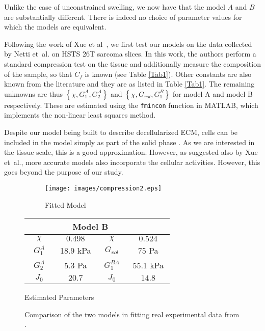 Unlike the case of unconstrained swelling, we now have that the model $A$ and $B$ are substantially different. There is indeed no choice of parameter values for which the models are equivalent. 

Following the work of Xue et al~\cite{ecm2}, we first test our models on the data collected by Netti et~al. \cite{Netti} on HSTS 26T sarcoma slices. In this work, the authors perform a standard compression test on the tissue and additionally measure the composition of the sample, so that $C_f$ is known (see Table \ref{Tab1}). Other constants are also known from the literature and they are as listed in Table \ref{Tab1}. The remaining unknowns are thus $\left\{\chi, G^A_1, G^A_2\right\}$ and  $\left\{\chi, G_{vol}, G^B_1\right\}$ for model A and model B respectively. These are estimated using the \texttt{fmincon} function in MATLAB, which implements the non-linear least squares method.

Despite our model being built to describe decellularized ECM, cells can be included in the model simply as part of the solid phase \cite{ecm2}. As we are interested in the tissue scale, this is a good approximation. However, as suggested also by Xue et~al.\cite{ecm2}, more accurate models also incorporate the cellular activities. However, this goes beyond the purpose of our study. 

\begin{figure}[h]
	\hspace{-8mm}
	\begin{subfigure}{0.62\textwidth}
		\hspace{2mm}
		\texttt{[image: images/compression2.eps]}
		\caption{Fitted Model}
		\label{fit}
	\end{subfigure}
	\begin{subtable}{0.375\textwidth}
		\begin{tabular}{c | c ||c| c }		
			\hline\addlinespace[2pt]
			\multicolumn{2}{c||}{Model A} &  \multicolumn{2}{c}{Model B}\\[0.5mm]
			\hline\addlinespace[2pt]
			$\quad \chi\quad$ & $\quad0.498\quad$ &$\quad \chi\quad$&$\quad0.524\quad$\\[0.5mm]
			$G^A_1$ & 18.9 kPa&$G_{vol}$&75 Pa\\[0.5mm]
			$G^A_2$ & 5.3 Pa&$G^{BA}_{1}$& 55.1 kPa\\[0.5mm]
			$J_0$ & $20.7$&  $J_0$&$14.8$\\[0.5mm]
			\hline
		\end{tabular}
		\caption{Estimated Parameters}
		\label{param}
	\end{subtable}
	\caption{Comparison of the two models in fitting real experimental data from \cite{Netti}.}		
\end{figure}

